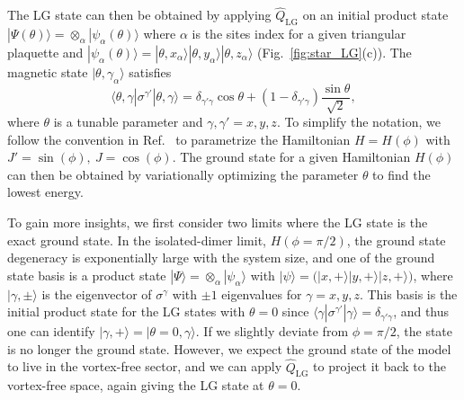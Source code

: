 \documentclass{ntuthesis}
\begin{document}
The LG state can then be obtained by applying $\hat{Q}_{\text{LG}}$ on an initial product state $|\Psi(\theta) \rangle = \otimes_\alpha |\psi_\alpha (\theta) \rangle$ where $\alpha$ is the sites index for a given triangular plaquette and $|\psi_\alpha (\theta)\rangle =  |\theta, x_\alpha \rangle  |\theta, y_\alpha \rangle  |\theta, z_\alpha \rangle$ (Fig.~\ref{fig:star_LG}(c)). 
%
 The magnetic state $ |\theta, \gamma_\alpha \rangle$ satisfies
\begin{equation}
\langle \theta, \gamma| \sigma^{\gamma'}|\theta , \gamma \rangle = \delta_{\gamma' \gamma} \cos \theta + (1-\delta_{\gamma' \gamma})\frac{\sin \theta}{\sqrt{2}}, 
\end{equation}
where $\theta$ is a tunable parameter and $\gamma, \gamma'=x,y,z$.
%
To simplify the notation, we follow the convention in Ref.~\cite{non-AbelianTO_2020} to parametrize the Hamiltonian $H = H(\phi)$ with $J' = \sin(\phi), \ J = \cos(\phi)$. 
%
The ground state for a given Hamiltonian $H(\phi)$ can  then be obtained by variationally optimizing the parameter $\theta$ to find the lowest energy.

To gain more insights, we first consider two limits where the LG state is the exact ground state.  
%
In the isolated-dimer limit,  $H(\phi = \pi/2)$, the  ground state degeneracy is exponentially large with the system size, and one of the ground state basis is a product state $|\Psi \rangle = \otimes_\alpha |\psi_\alpha \rangle$ with $|\psi\rangle = \big( |x,+\rangle | y,+\rangle |z, + \rangle \big)$, where $|\gamma,\pm\rangle$ is the eigenvector of $\sigma^\gamma$ with $\pm 1$ eigenvalues for $\gamma = x,y,z$. 
%
This basis is the initial product state for the LG states with $\theta = 0$ since  $\langle \gamma| \sigma^{\gamma'}| \gamma \rangle = \delta_{\gamma' \gamma}$, and thus one can identify $|\gamma,+\rangle = |\theta = 0, \gamma \rangle$.
%
If we slightly deviate from  $\phi=\pi/2 $, the state is no longer the ground state. 
%
However, we expect the ground state of the model to live in the vortex-free sector, and  
we can apply $\hat{Q}_{\text{LG}}$ to project it back to the vortex-free space,  again giving the LG state at $\theta = 0$.
\end{document}

